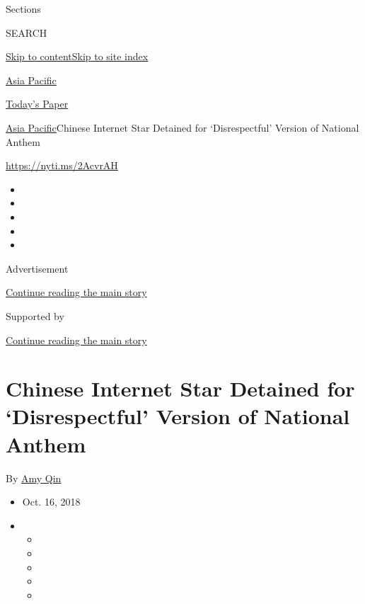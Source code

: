 Sections

SEARCH

\protect\hyperlink{site-content}{Skip to
content}\protect\hyperlink{site-index}{Skip to site index}

\href{https://www.nytimes.com/section/world/asia}{Asia Pacific}

\href{https://myaccount.nytimes.com/auth/login?response_type=cookie\&client_id=vi}{}

\href{https://www.nytimes.com/section/todayspaper}{Today's Paper}

\href{/section/world/asia}{Asia Pacific}\textbar{}Chinese Internet Star
Detained for `Disrespectful' Version of National Anthem

\url{https://nyti.ms/2AcvrAH}

\begin{itemize}
\item
\item
\item
\item
\item
\end{itemize}

Advertisement

\protect\hyperlink{after-top}{Continue reading the main story}

Supported by

\protect\hyperlink{after-sponsor}{Continue reading the main story}

\hypertarget{chinese-internet-star-detained-for-disrespectful-version-of-national-anthem}{%
\section{Chinese Internet Star Detained for `Disrespectful' Version of
National
Anthem}\label{chinese-internet-star-detained-for-disrespectful-version-of-national-anthem}}

By \href{https://www.nytimes.com/by/amy-qin}{Amy Qin}

\begin{itemize}
\item
  Oct. 16, 2018
\item
  \begin{itemize}
  \item
  \item
  \item
  \item
  \item
  \end{itemize}
\end{itemize}

